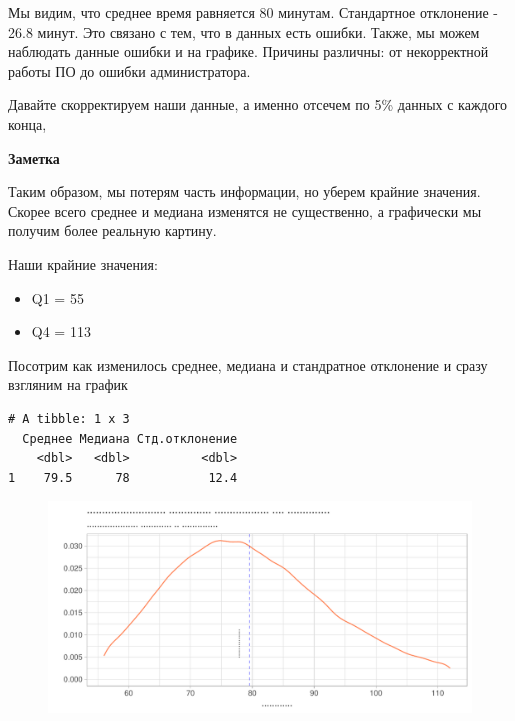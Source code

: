 \documentclass[
  letterpaper,
  DIV=11,
  numbers=noendperiod]{scrartcl}
\begin{document}
Мы видим, что среднее время равняется 80 минутам. Стандартное отклонение
- 26.8 минут. Это связано с тем, что в данных есть ошибки. Также, мы
можем наблюдать данные ошибки и на графике. Причины различны: от
некорректной работы ПО до ошибки администратора.

Давайте скорректируем наши данные, а именно отсечем по 5\% данных с
каждого конца,

\begin{tcolorbox}[enhanced jigsaw, left=2mm, bottomrule=.15mm, opacityback=0, arc=.35mm, colframe=quarto-callout-note-color-frame, rightrule=.15mm, colback=white, toprule=.15mm, breakable, leftrule=.75mm]
\begin{minipage}[t]{5.5mm}
\textcolor{quarto-callout-note-color}{\faInfo}
\end{minipage}%
\begin{minipage}[t]{\textwidth - 5.5mm}

\textbf{Заметка}\vspace{2mm}

Таким образом, мы потерям часть информации, но уберем крайние значения.
Скорее всего среднее и медиана изменятся не существенно, а графически мы
получим более реальную картину.

\end{minipage}%
\end{tcolorbox}

Наши крайние значения:

\begin{itemize}
\item
  Q1 = 55
\item
  Q4 = 113
\end{itemize}

Посотрим как изменилось среднее, медиана и стандратное отклонение и
сразу взгляним на график

\begin{verbatim}
# A tibble: 1 x 3
  Среднее Медиана Стд.отклонение
    <dbl>   <dbl>          <dbl>
1    79.5      78           12.4
\end{verbatim}

\begin{figure}

{\centering \includegraphics{./intro_files/figure-pdf/unnamed-chunk-23-1.pdf}

}

\end{figure}
\end{document}
